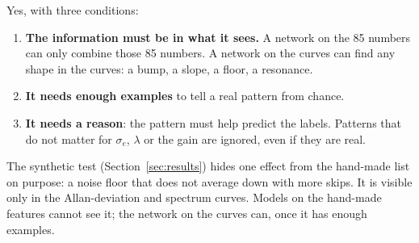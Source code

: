 \documentclass[10pt]{article}
\begin{document}
\begin{basic}
Yes, with three conditions:
\begin{enumerate}
\item \textbf{The information must be in what it sees.} A network on the 85 numbers can only combine those 85 numbers. A network on the
  curves can find any shape in the curves: a bump, a slope, a floor, a resonance.
\item \textbf{It needs enough examples} to tell a real pattern from chance.
\item \textbf{It needs a reason}: the pattern must help predict the labels. Patterns that do not matter for $\sigma_e$, $\lambda$ or the
  gain are ignored, even if they are real.
\end{enumerate}
The synthetic test (Section~\ref{sec:results}) hides one effect from the hand-made list on purpose: a noise floor that does not average
down with more skips. It is visible only in the Allan-deviation and spectrum curves. Models on the hand-made features cannot see it;
the network on the curves can, once it has enough examples.
\end{basic}
\end{document}
